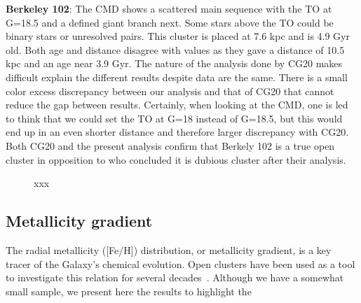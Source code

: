 \documentclass[draft]{aa}
\begin{document}
\textbf{Berkeley 102}: The CMD shows a scattered main sequence with the
TO at G=18.5 and a defined giant branch next. Some stars above the TO could be
binary stars or unresolved pairs. This cluster is placed at 7.6 kpc and is 4.9
Gyr old. Both age and distance disagree with \cite{Cantat_2020}
values as they gave a distance of 10.5 kpc and an age near
3.9 Gyr. The nature of the analysis done by CG20 makes difficult
explain the different results despite data are the same. There is a small
color excess discrepancy between our analysis and that of CG20 that cannot
reduce the gap between results. Certainly, when looking at the CMD, one is led
to think that we could set the TO at G=18 instead of G=18.5, but this would
end up in an even shorter distance and therefore larger discrepancy with CG20.
Both CG20 and the present analysis confirm that Berkely 102 is a true open cluster
in opposition to \cite{Maciejewski_2008} who concluded it is dubious cluster after their
analysis.\\


 

 \begin{figure}
  \caption{xxx}
  \label{fig:MWmap_vectors}
 \end{figure}






 \subsection{Metallicity gradient}
  \label{ssec:met_gradient}

  The radial metallicity ([Fe/H]) distribution, or metallicity gradient, is a
  key tracer of the Galaxy's chemical evolution. Open clusters have been used as
  a tool to investigate this relation for several decades~\citep{Janes_1979}.
  Although we have a somewhat small sample, we present here the results to
  highlight the 
\end{document}
